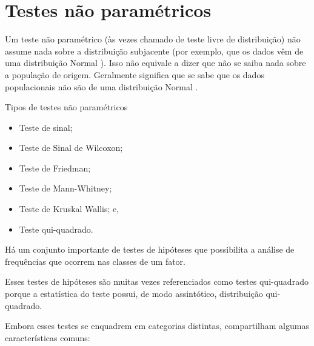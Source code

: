 \documentclass[
]{book}
\providecommand{\tightlist}{%
  \setlength{\itemsep}{0pt}\setlength{\parskip}{0pt}}
\begin{document}
\hfill\break

\hypertarget{testes-nuxe3o-paramuxe9tricos}{%
\section{Testes não paramétricos}\label{testes-nuxe3o-paramuxe9tricos}}

Um teste não paramétrico (às vezes chamado de teste livre de distribuição) não assume nada sobre a distribuição subjacente (por exemplo, que os dados vêm de uma distribuição Normal ). Isso não equivale a dizer que não se saiba nada sobre a população de origem. Geralmente significa que se sabe que os dados populacionais não são de uma distribuição Normal .

\hfill\break

Tipos de testes não paramétricos

\hfill\break

\begin{itemize}
\tightlist
\item
  Teste de sinal;
\item
  Teste de Sinal de Wilcoxon;
\item
  Teste de Friedman;
\item
  Teste de Mann-Whitney;
\item
  Teste de Kruskal Wallis; e,\\
\item
  Teste qui-quadrado.
\end{itemize}

\hfill\break

Há um conjunto importante de testes de hipóteses que possibilita a análise de frequências que ocorrem nas classes de um fator.

\hfill\break

Esses testes de hipóteses são muitas vezes referenciados como testes qui-quadrado porque a estatística do teste possui, de modo assintótico, distribuição qui-quadrado.

\hfill\break
Embora esses testes se enquadrem em categorias distintas, compartilham algumas características comuns:

\hfill\break
\end{document}
